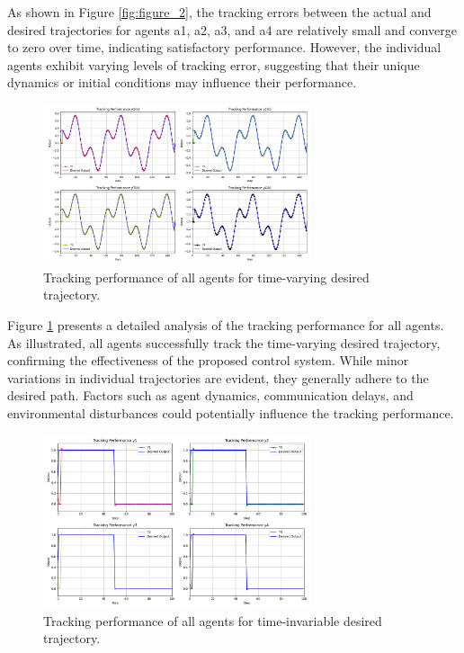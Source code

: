 \documentclass[journal,onecolumn]{IEEEtran}
\begin{document}
As shown in Figure \ref{fig:figure_2}, the tracking errors between the actual and desired trajectories for agents a1, a2, a3, and a4 are relatively small and converge to zero over time, indicating satisfactory performance. However, the individual agents exhibit varying levels of tracking error, suggesting that their unique dynamics or initial conditions may influence their performance.

\begin{figure}[h!]
    \centering
    \includegraphics[width=0.7\textwidth]{Figure_3.png}
    \caption{Tracking performance of all agents for time-varying desired trajectory.}
    \label{fig:figure_3} %
\end{figure}

Figure \ref{fig:figure_3} presents a detailed analysis of the tracking performance for all agents. As illustrated, all agents successfully track the time-varying desired trajectory, confirming the effectiveness of the proposed control system. While minor variations in individual trajectories are evident, they generally adhere to the desired path. Factors such as agent dynamics, communication delays, and environmental disturbances could potentially influence the tracking performance.

\begin{figure}[h!]
    \centering
    \includegraphics[width=0.7\textwidth]{Figure_4.png}
    \caption{Tracking performance of all agents for time-invariable desired trajectory.}
    \label{fig:figure_4} %
\end{figure}
\end{document}
